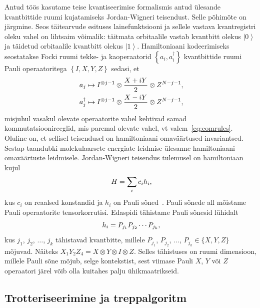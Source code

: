 \documentclass[12pt]{report}
\def\cparen#1{\left\{#1\right\}}
\def\ket#1{\left|#1\right>}
\begin{document}
Antud töös kasutame teise kvantiseerimise formalismis antud ülesande kvantbittide ruumi kujatamiseks Jordan-Wigneri teisendust.
Selle põhimõte on järgmine.
Seos täitearvude esituses lainefunktsiooni ja sellele vastava kvantregistri oleku vahel on lihtsaim võimalik: täitmata orbitaalile vastab kvantbitt olekus \(\ket{0}\) ja täidetud orbitaalile kvantbitt olekus \(\ket{1}\).
Hamiltoniaani kodeerimiseks seostatakse Focki ruumi tekke- ja kaoperaatorid \(\cparen{a_i, a_i^\dagger}\) kvantbittide ruumi Pauli operaatoritega \(\cparen{I, X, Y, Z}\) sedasi, et
\begin{align}
    a_j &\mapsto I^{\otimes j-1} \otimes \frac{X+iY}{2} \otimes Z^{N-j-1} \rlap{,} \\
    a_j^\dagger &\mapsto I^{\otimes j-1} \otimes \frac{X-iY}{2} \otimes Z^{N-j-1} \rlap{,}
\end{align}
misjuhul vasakul olevate operaatorite vahel kehtivad samad kommutatsioonireeglid, mis paremal olevate vahel, vt valem~\eqref{eq:comrules}.
Oluline on, et sellisel teisendusel on hamiltoniaani omaväärtused invariantsed.
Sestap taandubki molekulaarsete energiate leidmise ülesanne hamiltoniaani omaväärtuste leidmisele.
Jordan-Wigneri teisendus tulemusel on hamiltoniaan kujul
\begin{align}\label{eq:paulisum}
    H = \sum_i c_i h_i \rlap{,}
\end{align}
kus \(c_i\) on reaalsed konstandid ja \(h_i\) on Pauli sõned~\cite{whitfield+etal2011, mcardle+etal}.
Pauli sõnede all mõistame Pauli operaatorite tensorkorrutisi.
Edaspidi tähistame Pauli sõnesid lühidalt
\begin{equation} h_i=P_{j_1}P_{j_2}\cdots P_{j_k} \rlap{,}\end{equation}
kus \(j_1\), \(j_2\), $\ldots$, \(j_k\) tähistavad kvantbitte, millele \(P_{j_1}\), \(P_{j_2}\), \(\ldots\), \(P_{j_k}\in\{X,Y,Z\}\) mõjuvad.
Näiteks \(X_1Y_2Z_4=X\otimes Y\otimes I\otimes Z.\)
Selles tähistuses on ruumi dimensioon, millele Pauli sõne mõjub, selge kontekstist, sest viimase Pauli \(X\), \(Y\) või \(Z\) operaatori järel võib olla kuitahes palju ühikmaatrikseid.

\subsection{Trotteriseerimine ja treppalgoritm}\label{sec:qcirc}
\end{document}
